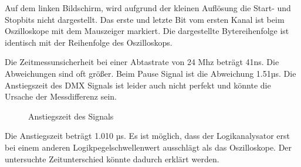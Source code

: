Auf dem linken Bildschirm, wird aufgrund der kleinen Auflösung die Start- und Stopbits nicht dargestellt. Das erste und letzte Bit vom ersten Kanal ist beim Oszilloskope mit dem Mauszeiger markiert. Die dargestellte Bytereihenfolge ist identisch mit der Reihenfolge des Oszilloskops.

Die Zeitmessunsicherheit bei einer Abtastrate von 24 Mhz beträgt 41ns. Die Abweichungen sind oft größer. Beim Pause Signal ist die Abweichung 1.51µs. Die Anstiegszeit des DMX Signals ist leider auch nicht perfekt und könnte die Ursache der Messdifferenz sein.

\begin{figure}[H]
	\centering
	\caption{Anstiegszeit des Signals}
\end{figure}

Die Anstiegszeit beträgt 1.010 µs. Es ist möglich, dass der Logikanalysator erst bei einem anderen Logikpegelschwellenwert ausschlägt als das Oszilloskope. Der untersuchte Zeitunterschied könnte dadurch erklärt werden.
